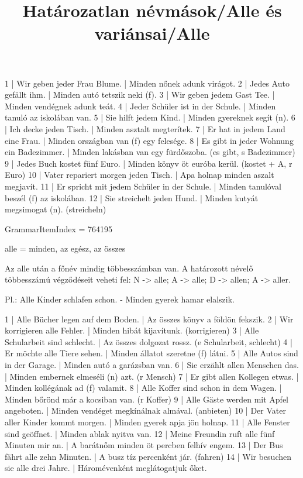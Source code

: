 \begin{exmp}
1 | Wir geben jeder Frau Blume. | Minden nőnek adunk virágot.
2 | Jedes Auto gefällt ihm. | Minden autó tetszik neki (f).
3 | Wir geben jedem Gast Tee. | Minden vendégnek adunk teát.
4 | Jeder Schüler ist in der Schule. | Minden tanuló az iskolában van.
5 | Sie hilft jedem Kind. | Minden gyereknek segít (n).
6 | Ich decke jeden Tisch. | Minden asztalt megterítek.
7 | Er hat in jedem Land eine Frau. | Minden országban van (f) egy felesége.
8 | Es gibt in jeder Wohnung ein Badezimmer. | Minden lakásban van egy fürdőszoba. (es gibt, s Badezimmer)
9 | Jedes Buch kostet fünf Euro. | Minden könyv öt euróba kerül. (kostet + A, r Euro)
10 | Vater repariert morgen jeden Tisch. | Apa holnap minden aszalt megjavít.
11 | Er spricht mit jedem Schüler in der Schule. | Minden tanulóval beszél (f) az iskolában.
12 | Sie streichelt jeden Hund. | Minden kutyát megsimogat (n). (streicheln)
\end{exmp}

\title{Határozatlan névmások/Alle és variánsai/Alle}

GrammarItemIndex = 764195

\begin{desc}
alle = minden, az egész, az összes

Az alle után a főnév mindig többesszámban van. A határozott névelő többesszámú végződéseit veheti fel:
N -> alle;
A -> alle;
D -> allen;
A -> aller.

Pl.: Alle Kinder schlafen schon. - Minden gyerek hamar elalszik.
\end{desc}

\begin{exmp}
1 | Alle Bücher legen auf dem Boden. | Az összes könyv a földön fekszik.
2 | Wir korrigieren alle Fehler. | Minden hibát kijavítunk. (korrigieren)
3 | Alle Schularbeit sind schlecht. | Az összes dolgozat rossz. (e Schularbeit, schlecht)
4 | Er möchte alle Tiere sehen. | Minden állatot szeretne (f) látni.
5 | Alle Autos sind in der Garage. | Minden autó a garázsban van.
6 | Sie erzählt allen Menschen das. | Minden embernek elmeséli (n) azt. (r Mensch)
7 | Er gibt allen Kollegen etwas. | Minden kollégának ad (f) valamit.
8 | Alle Koffer sind schon in dem Wagen. | Minden bőrönd már a kocsiban van. (r Koffer)
9 | Alle Gäste werden mit Apfel angeboten. | Minden vendéget megkínálnak almával. (anbieten)
10 | Der Vater aller Kinder kommt morgen. | Minden gyerek apja jön holnap.
11 | Alle Fenster sind geöffnet. | Minden ablak nyitva van.
12 | Meine Freundin ruft alle fünf Minuten mir an. | A barátnőm minden öt percben felhív engem.
13 | Der Bus fährt alle zehn Minuten. | A busz tíz percenként jár. (fahren)
14 | Wir besuchen sie alle drei Jahre. | Háromévenként meglátogatjuk őket.
\end{exmp}

